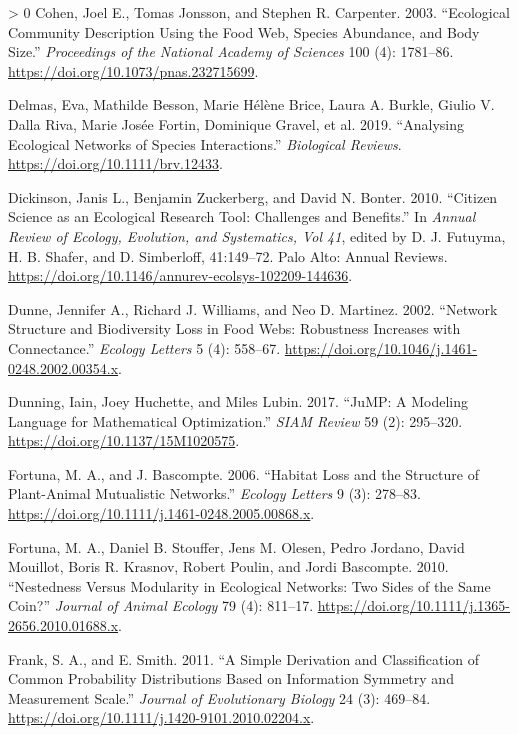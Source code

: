 \documentclass[11pt]{article}
\newlength{\cslhangindent}
\newenvironment{CSLReferences}[3] %
 {%
  \setlength{\parindent}{0pt}
  \ifodd #1 \everypar{\setlength{\hangindent}{\cslhangindent}}\ignorespaces\fi
  \ifnum #2 > 0
  \setlength{\parskip}{#2\baselineskip}
  \fi
 }%
 {}
\begin{document}
\begin{CSLReferences}{1}{0}
\leavevmode\hypertarget{ref-Cohen2003EcoComa}{}%
Cohen, Joel E., Tomas Jonsson, and Stephen R. Carpenter. 2003.
{``Ecological Community Description Using the Food Web, Species
Abundance, and Body Size.''} \emph{Proceedings of the National Academy
of Sciences} 100 (4): 1781--86.
\url{https://doi.org/10.1073/pnas.232715699}.

\leavevmode\hypertarget{ref-Delmas2019AnaEco}{}%
Delmas, Eva, Mathilde Besson, Marie Hélène Brice, Laura A. Burkle,
Giulio V. Dalla Riva, Marie Josée Fortin, Dominique Gravel, et al. 2019.
{``Analysing Ecological Networks of Species Interactions.''}
\emph{Biological Reviews}. \url{https://doi.org/10.1111/brv.12433}.

\leavevmode\hypertarget{ref-Dickinson2010CitSci}{}%
Dickinson, Janis L., Benjamin Zuckerberg, and David N. Bonter. 2010.
{``Citizen Science as an Ecological Research Tool: Challenges and
Benefits.''} In \emph{Annual Review of Ecology, Evolution, and
Systematics, Vol 41}, edited by D. J. Futuyma, H. B. Shafer, and D.
Simberloff, 41:149--72. Palo Alto: Annual Reviews.
\url{https://doi.org/10.1146/annurev-ecolsys-102209-144636}.

\leavevmode\hypertarget{ref-Dunne2002NetStrb}{}%
Dunne, Jennifer A., Richard J. Williams, and Neo D. Martinez. 2002.
{``Network Structure and Biodiversity Loss in Food Webs: Robustness
Increases with Connectance.''} \emph{Ecology Letters} 5 (4): 558--67.
\url{https://doi.org/10.1046/j.1461-0248.2002.00354.x}.

\leavevmode\hypertarget{ref-Dunning2017JumMod}{}%
Dunning, Iain, Joey Huchette, and Miles Lubin. 2017. {``JuMP: A Modeling
Language for Mathematical Optimization.''} \emph{SIAM Review} 59 (2):
295--320. \url{https://doi.org/10.1137/15M1020575}.

\leavevmode\hypertarget{ref-Fortuna2006HabLos}{}%
Fortuna, M. A., and J. Bascompte. 2006. {``Habitat Loss and the
Structure of Plant-Animal Mutualistic Networks.''} \emph{Ecology
Letters} 9 (3): 278--83.
\url{https://doi.org/10.1111/j.1461-0248.2005.00868.x}.

\leavevmode\hypertarget{ref-Fortuna2010NesMod}{}%
Fortuna, M. A., Daniel B. Stouffer, Jens M. Olesen, Pedro Jordano, David
Mouillot, Boris R. Krasnov, Robert Poulin, and Jordi Bascompte. 2010.
{``Nestedness Versus Modularity in Ecological Networks: Two Sides of the
Same Coin?''} \emph{Journal of Animal Ecology} 79 (4): 811--17.
\url{https://doi.org/10.1111/j.1365-2656.2010.01688.x}.

\leavevmode\hypertarget{ref-Frank2011SimDera}{}%
Frank, S. A., and E. Smith. 2011. {``A Simple Derivation and
Classification of Common Probability Distributions Based on Information
Symmetry and Measurement Scale.''} \emph{Journal of Evolutionary
Biology} 24 (3): 469--84.
\url{https://doi.org/10.1111/j.1420-9101.2010.02204.x}.


\end{CSLReferences}
\end{document}

